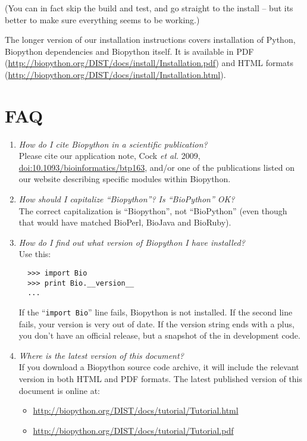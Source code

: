 \documentclass{report}
\begin{document}
\noindent (You can in fact skip the build and test, and go straight to the install --
but its better to make sure everything seems to be working.)

The longer version of our installation instructions covers
installation of Python, Biopython dependencies and Biopython itself.
It is available in PDF
(\url{http://biopython.org/DIST/docs/install/Installation.pdf})
and HTML formats
(\url{http://biopython.org/DIST/docs/install/Installation.html}).

\section{FAQ}

\begin{enumerate}

  \item \emph{How do I cite Biopython in a scientific publication?} \\
  Please cite our application note, Cock \textit{et al.} 2009,
  \href{http://dx.doi.org/10.1093/bioinformatics/btp163}{doi:10.1093/bioinformatics/btp163},
  and/or one of the publications listed on our website describing specific modules within Biopython.

  \item \emph{How should I capitalize ``Biopython''?  Is ``BioPython'' OK?} \\
  The correct capitalization is ``Biopython'', not ``BioPython'' (even though
  that would have matched BioPerl, BioJava and BioRuby).

  \item \emph{How do I find out what version of Biopython I have installed?} \\
  Use this:
  \begin{verbatim}
  >>> import Bio
  >>> print Bio.__version__
  ...
  \end{verbatim}
  If the ``\verb|import Bio|'' line fails, Biopython is not installed.
  If the second line fails, your version is very out of date.
  If the version string ends with a plus, you don't have an official
  release, but a snapshot of the in development code. 

  \item \emph{Where is the latest version of this document?}\\
  If you download a Biopython source code archive, it will include the
  relevant version in both HTML and PDF formats.  The latest published
  version of this document is online at:
  \begin{itemize}
  \item \url{http://biopython.org/DIST/docs/tutorial/Tutorial.html}
  \item \url{http://biopython.org/DIST/docs/tutorial/Tutorial.pdf}
  \end{itemize}
  

\end{enumerate}
\end{document}
